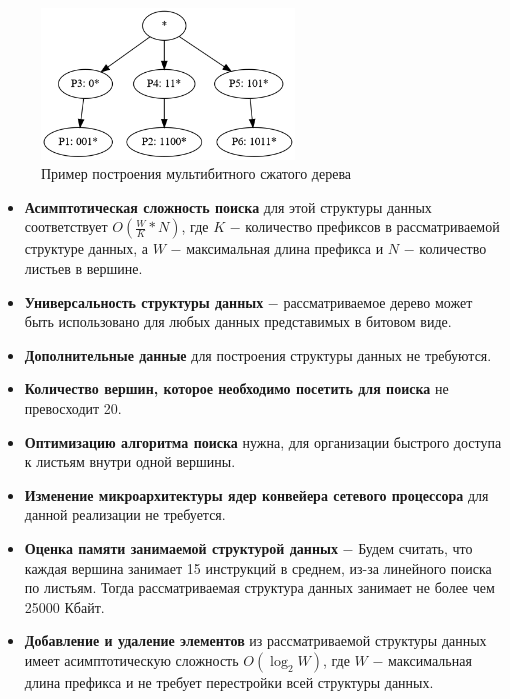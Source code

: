 \documentclass[a4peper, 12pt, titlepage, finall]{report}
\begin{document}
            \begin{figure}[h]
                \centering
                \includegraphics[width=0.6\textwidth]{multybit_compressed.png}
                \caption{Пример построения мультибитного сжатого дерева}\label{fig:mesh3}
            \end{figure}

            \begin{itemize}
                \item\textbf{Асимптотическая сложность поиска} для этой структуры данных соответствует {\ttfamily $O(\frac{W}{K}*N)$},
                где {\ttfamily $K$} $-$ количество префиксов в рассматриваемой структуре данных, а {\ttfamily $W$} $-$ максимальная длина префикса
                и {\ttfamily $N$} $-$ количество листьев в вершине.
                \item\textbf{Универсальность структуры данных} $-$ рассматриваемое дерево может быть использовано для любых данных представимых в битовом виде.
                \item\textbf{Дополнительные данные} для построения структуры данных не требуются.
                \item\textbf{Количество вершин, которое необходимо посетить для поиска} не превосходит 20. 
                \item\textbf{Оптимизацию алгоритма поиска} нужна, для организации быстрого доступа к листьям внутри одной вершины. 
                \item\textbf{Изменение микроархитектуры ядер конвейера сетевого процессора} для данной реализации не требуется.
                \item\textbf{Оценка памяти занимаемой структурой данных} $-$ Будем считать, что каждая вершина занимает 15 инструкций в среднем, из-за линейного поиска по листьям. 
                Тогда рассматриваемая структура данных занимает не более чем 25000 Кбайт.
                \item\textbf{Добавление и удаление элементов} из рассматриваемой структуры данных имеет асимптотическую сложность 
                {\ttfamily $O(\log_2{W})$}, где {\ttfamily $W$} $-$ максимальная длина префикса и не требует перестройки всей структуры данных.\\
            \end{itemize}
\end{document}
